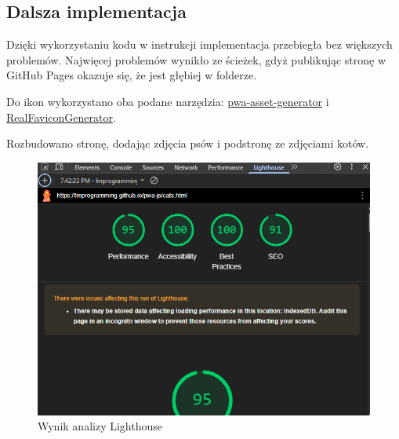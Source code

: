 \documentclass[a4paper,12pt]{article}
\begin{document}
\subsection{Dalsza implementacja}

Dzięki wykorzystaniu kodu w instrukcji implementacja przebiegła bez większych problemów. Najwięcej problemów wynikło ze ścieżek, gdyż publikując stronę w GitHub Pages okazuje się, że jest głębiej w folderze.

Do ikon wykorzystano oba podane narzędzia: \href{https://www.npmjs.com/package/pwa-asset-generator}{pwa-asset-generator} i \href{https://realfavicongenerator.net/}{RealFaviconGenerator}.

Rozbudowano stronę, dodając zdjęcia psów i podstronę ze zdjęciami kotów.

\begin{figure}[H]
    \centering
    \includegraphics[width=1\textwidth]{images/lighthouse.png}
    \caption{Wynik analizy Lighthouse}
\end{figure}
\end{document}
